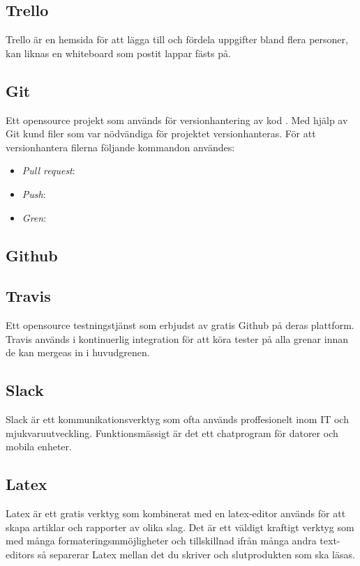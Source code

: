 \subsection*{Trello}
Trello är en hemsida för att lägga till och fördela uppgifter bland flera personer, kan liknas en whiteboard som postit lappar fästs på.

\subsection{Git}
Ett opensource projekt som används för versionhantering av kod \cite{Git52:online}. Med hjälp av Git kund filer som var nödvändiga för projektet versionhanteras. För att versionhantera filerna följande kommandon användes: 
\begin{itemize}
	\item \textit{Pull request}:
	\item \textit{Push}:
	\item \textit{Gren}:
\end{itemize}

\subsection*{Github}


\subsection*{Travis}
Ett opensource testningstjänst som erbjudst av gratis Github på deras plattform. Travis används i kontinuerlig integration för att köra tester på alla grenar innan de kan mergeas in i huvudgrenen.

\subsection*{Slack}
Slack är ett kommunikationsverktyg som ofta används proffesionelt inom IT och mjukvaruutveckling. Funktionsmässigt är det ett chatprogram för datorer och mobila enheter.

\subsection*{Latex}
Latex är ett gratis verktyg som kombinerat med en latex-editor används för att skapa artiklar och rapporter av olika slag. Det är ett väldigt kraftigt verktyg som med många formateringsmmöjligheter och tillskillnad ifrån många andra text-editors så separerar Latex mellan det du skriver och slutprodukten som ska läsas.
